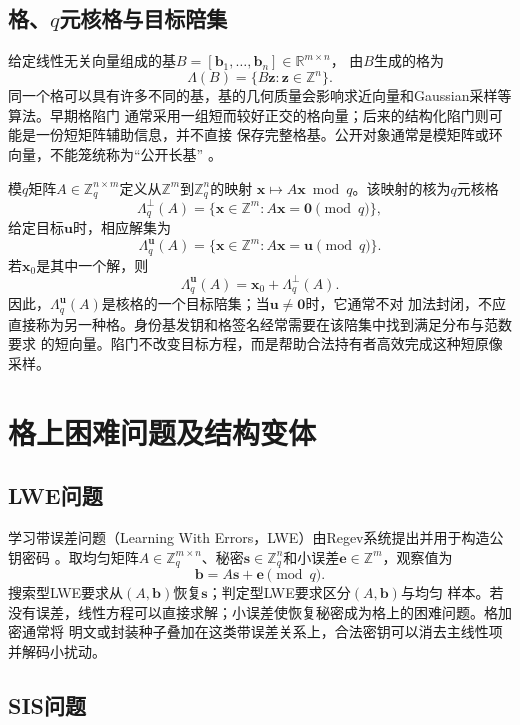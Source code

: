 \subsection{格、$q$元核格与目标陪集}

给定线性无关向量组成的基$B=[\mathbf b_1,\ldots,\mathbf b_n]\in\mathbb R^{m\times n}$，
由$B$生成的格为
\[
  \Lambda(B)=\{B\mathbf z:\mathbf z\in\mathbb Z^n\}.
\]
同一个格可以具有许多不同的基，基的几何质量会影响求近向量和Gaussian采样等算法。早期格陷门
通常采用一组短而较好正交的格向量；后来的结构化陷门则可能是一份短矩阵辅助信息，并不直接
保存完整格基。公开对象通常是模矩阵或环向量，不能笼统称为“公开长基”
\cite{gpv2008,micciancio2012trapdoors}。

模$q$矩阵$A\in\mathbb Z_q^{n\times m}$定义从$\mathbb Z^m$到$\mathbb Z_q^n$的映射
$\mathbf x\mapsto A\mathbf x\bmod q$。该映射的核为$q$元核格
\[
 \Lambda_q^\perp(A)=\{\mathbf x\in\mathbb Z^m:A\mathbf x=\mathbf0\pmod q\},
\]
给定目标$\mathbf u$时，相应解集为
\[
 \Lambda_q^{\mathbf u}(A)=\{\mathbf x\in\mathbb Z^m:A\mathbf x=\mathbf u\pmod q\}.
\]
若$\mathbf x_0$是其中一个解，则
\[
 \Lambda_q^{\mathbf u}(A)=\mathbf x_0+\Lambda_q^\perp(A).
\]
因此，$\Lambda_q^{\mathbf u}(A)$是核格的一个目标陪集；当$\mathbf u\ne\mathbf0$时，它通常不对
加法封闭，不应直接称为另一种格。身份基发钥和格签名经常需要在该陪集中找到满足分布与范数要求
的短向量。陷门不改变目标方程，而是帮助合法持有者高效完成这种短原像采样。

\section{格上困难问题及结构变体}

\subsection{LWE问题}

学习带误差问题（Learning With Errors，LWE）由Regev系统提出并用于构造公钥密码
\cite{regev2005lwe}。取均匀矩阵$A\in\mathbb Z_q^{m\times n}$、秘密$\mathbf s\in\mathbb
Z_q^n$和小误差$\mathbf e\in\mathbb Z^m$，观察值为
\[
  \mathbf b=A\mathbf s+\mathbf e\pmod q.
\]
搜索型LWE要求从$(A,\mathbf b)$恢复$\mathbf s$；判定型LWE要求区分$(A,\mathbf b)$与均匀
样本。若没有误差，线性方程可以直接求解；小误差使恢复秘密成为格上的困难问题。格加密通常将
明文或封装种子叠加在这类带误差关系上，合法密钥可以消去主线性项并解码小扰动。

\subsection{SIS问题}

